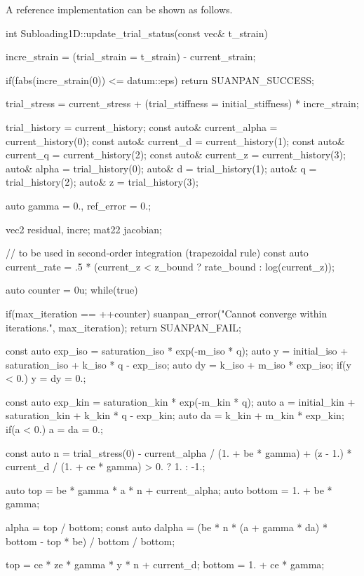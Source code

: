 A reference implementation can be shown as follows.
\begin{cppcode}
int Subloading1D::update_trial_status(const vec& t_strain) {
    incre_strain = (trial_strain = t_strain) - current_strain;

    if(fabs(incre_strain(0)) <= datum::eps) return SUANPAN_SUCCESS;

    trial_stress = current_stress + (trial_stiffness = initial_stiffness) * incre_strain;

    trial_history = current_history;
    const auto& current_alpha = current_history(0);
    const auto& current_d = current_history(1);
    const auto& current_q = current_history(2);
    const auto& current_z = current_history(3);
    auto& alpha = trial_history(0);
    auto& d = trial_history(1);
    auto& q = trial_history(2);
    auto& z = trial_history(3);

    auto gamma = 0., ref_error = 0.;

    vec2 residual, incre;
    mat22 jacobian;

    // to be used in second-order integration (trapezoidal rule)
    const auto current_rate = .5 * (current_z < z_bound ? rate_bound : log(current_z));

    auto counter = 0u;
    while(true) {
        if(max_iteration == ++counter) {
            suanpan_error("Cannot converge within {} iterations.\n", max_iteration);
            return SUANPAN_FAIL;
        }

        const auto exp_iso = saturation_iso * exp(-m_iso * q);
        auto y = initial_iso + saturation_iso + k_iso * q - exp_iso;
        auto dy = k_iso + m_iso * exp_iso;
        if(y < 0.) y = dy = 0.;

        const auto exp_kin = saturation_kin * exp(-m_kin * q);
        auto a = initial_kin + saturation_kin + k_kin * q - exp_kin;
        auto da = k_kin + m_kin * exp_kin;
        if(a < 0.) a = da = 0.;

        const auto n = trial_stress(0) - current_alpha / (1. + be * gamma) + (z - 1.) * current_d / (1. + ce * gamma) > 0. ? 1. : -1.;

        auto top = be * gamma * a * n + current_alpha;
        auto bottom = 1. + be * gamma;

        alpha = top / bottom;
        const auto dalpha = (be * n * (a + gamma * da) * bottom - top * be) / bottom / bottom;

        top = ce * ze * gamma * y * n + current_d;
        bottom = 1. + ce * gamma;

}}
\end{cppcode}
